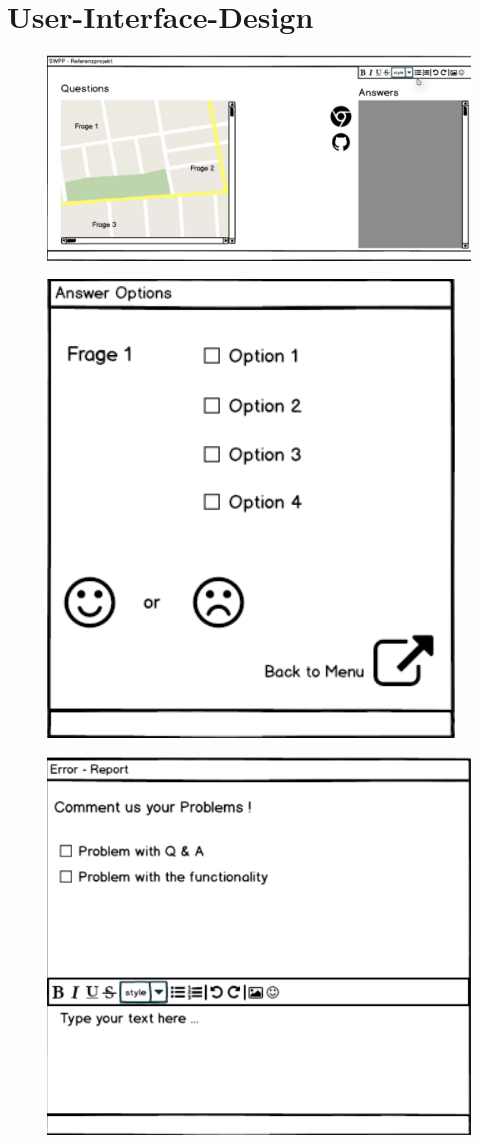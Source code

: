 \section{User-Interface-Design}



\begin{figure}
		\centering
		\includegraphics[width=0.7\linewidth]{screenshot002}
		\caption{}
		\label{fig:screenshot002}
\end{figure}



\begin{figure}
	\centering
	\includegraphics[width=0.7\linewidth]{screenshot003}
	\caption{}
	\label{fig:screenshot003}
\end{figure}


\begin{figure}
	\centering
	\includegraphics[width=0.7\linewidth]{screenshot004}
	\caption{}
	\label{fig:screenshot004}
\end{figure}


